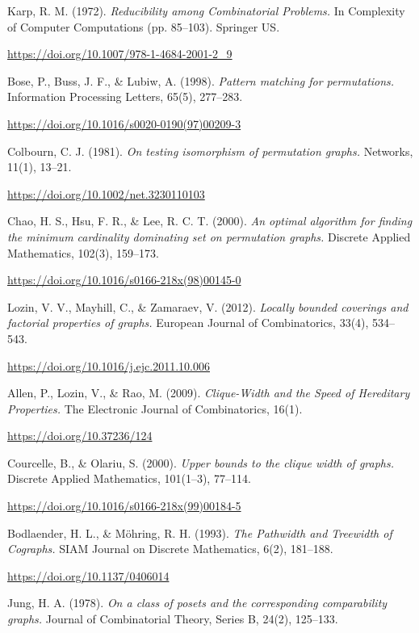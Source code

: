 \begin{thebibliography}{99}
     Karp, R. M. (1972).
    \textit{Reducibility among Combinatorial Problems. }
    In Complexity of Computer Computations (pp. 85–103). Springer US.

    \url{https://doi.org/10.1007/978-1-4684-2001-2_9}

     Bose, P., Buss, J. F., \& Lubiw, A. (1998).
    \textit{Pattern matching for permutations.}
    Information Processing Letters, 65(5), 277–283.

    \url{https://doi.org/10.1016/s0020-0190(97)00209-3}

     Colbourn, C. J. (1981).
    \textit{On testing isomorphism of permutation graphs.}
    Networks, 11(1), 13–21.

    \url{https://doi.org/10.1002/net.3230110103}

     Chao, H. S., Hsu, F. R., \& Lee, R. C. T. (2000).
    \textit{An optimal algorithm for finding the minimum cardinality dominating set on permutation graphs.}
    Discrete Applied Mathematics, 102(3), 159–173.

    \url{https://doi.org/10.1016/s0166-218x(98)00145-0}

     Lozin, V. V., Mayhill, C., \& Zamaraev, V. (2012).
    \textit{Locally bounded coverings and factorial properties of graphs.}
    European Journal of Combinatorics, 33(4), 534–543.

    \url{https://doi.org/10.1016/j.ejc.2011.10.006}

     Allen, P., Lozin, V., \& Rao, M. (2009).
    \textit{Clique-Width and the Speed of Hereditary Properties.}
    The Electronic Journal of Combinatorics, 16(1).

    \url{https://doi.org/10.37236/124}

     Courcelle, B., \& Olariu, S. (2000).
    \textit{Upper bounds to the clique width of graphs.}
    Discrete Applied Mathematics, 101(1–3), 77–114.

    \url{https://doi.org/10.1016/s0166-218x(99)00184-5}

     Bodlaender, H. L., \& Möhring, R. H. (1993).
    \textit{The Pathwidth and Treewidth of Cographs.}
    SIAM Journal on Discrete Mathematics, 6(2), 181–188.

    \url{https://doi.org/10.1137/0406014}

     Jung, H. A. (1978).
    \textit{On a class of posets and the corresponding comparability graphs.}
    Journal of Combinatorial Theory, Series B, 24(2), 125–133.


\end{thebibliography}
